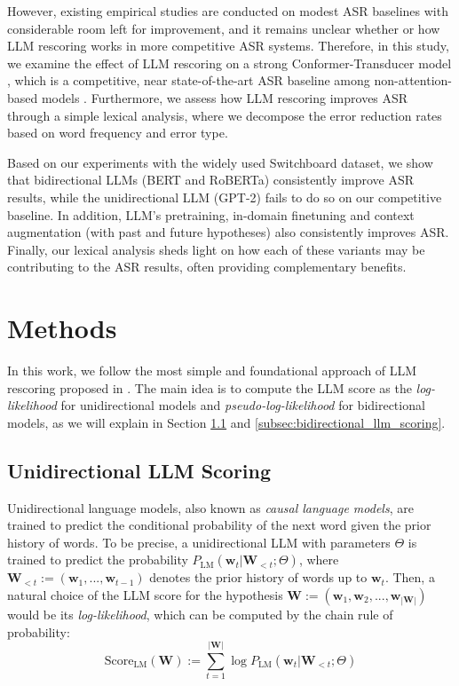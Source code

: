\documentclass[a4paper]{article}
\begin{document}
However, existing empirical studies are conducted on modest ASR baselines with considerable room left for improvement, and it remains unclear whether or how LLM rescoring works in more competitive ASR systems. Therefore, in this study, we examine the effect of LLM rescoring on a strong Conformer-Transducer model \cite{Gulati2020Conformer}, which is a competitive, near state-of-the-art ASR baseline among non-attention-based models \cite{Tske2020SingleHA}. Furthermore, we assess how LLM rescoring improves ASR through a simple lexical analysis, where we decompose the error reduction rates based on word frequency and error type.

Based on our experiments with the widely used Switchboard dataset, we show that bidirectional LLMs (BERT and RoBERTa) consistently improve ASR results, while the unidirectional LLM (GPT-2) fails to do so on our competitive baseline. In addition, LLM's pretraining, in-domain finetuning and context augmentation (with past and future hypotheses) also consistently improves ASR. Finally, our lexical analysis sheds light on how each of these variants may be contributing to the ASR results, often providing complementary benefits.

\section{Methods}
\label{sec:methods}

In this work, we follow the most simple and foundational approach of LLM rescoring proposed in \cite{shin2019effective,salazar-etal-2020-masked}. The main idea is to compute the LLM score as the \textit{log-likelihood} for unidirectional models and \textit{pseudo-log-likelihood} for bidirectional models, as we will explain in Section \ref{subsec:unidirectional_llm_scoring} and \ref{subsec:bidirectional_llm_scoring}.

\subsection{Unidirectional LLM Scoring}
\label{subsec:unidirectional_llm_scoring}

Unidirectional language models, also known as \textit{causal language models}, are trained to predict the conditional probability of the next word given the prior history of words. To be precise, a unidirectional LLM with parameters $\Theta$ is trained to predict the probability $P_{\mathrm{LM}} (\bm{w}_t | \bm{W}_{< t}; \Theta)$, where $\bm{W}_{< t} := (\bm{w}_1,..., \bm{w}_{t-1})$ denotes the prior history of words up to $\bm{w}_t$. Then, a natural choice of the LLM score for the hypothesis $\bm{W} := (\bm{w}_1, \bm{w}_2,..., \bm{w}_{|\bm{W}|})$ would be its \textit{log-likelihood}, which can be computed by the chain rule of probability:
\begin{equation}
\label{eqn:causal_lm_score}
\mathrm{Score}_{\mathrm{LM}}(\bm{W}) := \sum^{|\bm{W}|}_{t=1} \log P_{\mathrm{LM}} (\bm{w}_t | \bm{W}_{< t}; \Theta)
\end{equation}
\end{document}
